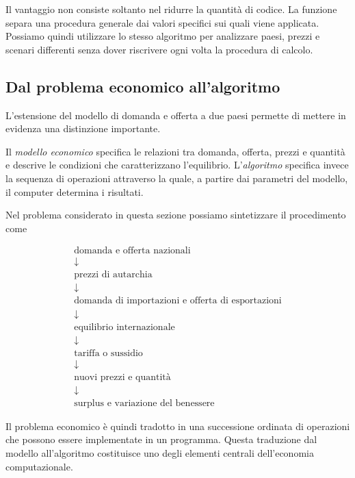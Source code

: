 Il vantaggio non consiste soltanto nel ridurre la quantità di
codice. La funzione separa una procedura generale dai valori
specifici sui quali viene applicata. Possiamo quindi utilizzare
lo stesso algoritmo per analizzare paesi, prezzi e scenari
differenti senza dover riscrivere ogni volta la procedura di
calcolo.


\subsection{Dal problema economico all'algoritmo}

L'estensione del modello di domanda e offerta a due paesi permette
di mettere in evidenza una distinzione importante.

Il \emph{modello economico} specifica le relazioni tra domanda,
offerta, prezzi e quantità e descrive le condizioni che
caratterizzano l'equilibrio. L'\emph{algoritmo} specifica invece
la sequenza di operazioni attraverso la quale, a partire dai
parametri del modello, il computer determina i risultati.

Nel problema considerato in questa sezione possiamo sintetizzare
il procedimento come

\begin{equation*}
\boxed{
\begin{array}{c}
\text{domanda e offerta nazionali}\\
\downarrow\\
\text{prezzi di autarchia}\\
\downarrow\\
\text{domanda di importazioni e offerta di esportazioni}\\
\downarrow\\
\text{equilibrio internazionale}\\
\downarrow\\
\text{tariffa o sussidio}\\
\downarrow\\
\text{nuovi prezzi e quantità}\\
\downarrow\\
\text{surplus e variazione del benessere}
\end{array}}
\end{equation*}

Il problema economico è quindi tradotto in una successione
ordinata di operazioni che possono essere implementate in un
programma. Questa traduzione dal modello all'algoritmo costituisce
uno degli elementi centrali dell'economia computazionale.

